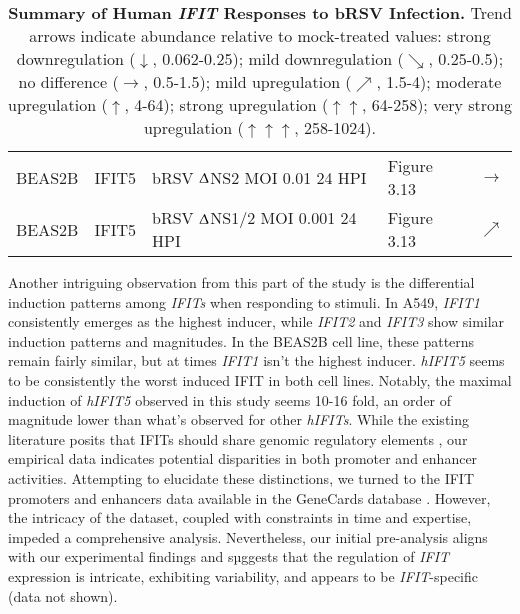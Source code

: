 \begin{table}
\begin{tabular}{lllll}
        BEAS2B & IFIT5 & bRSV $\Updelta$NS2 MOI 0.01 24 HPI & Figure 3.13 & \(\rightarrow\) \\ 
        BEAS2B & IFIT5 & bRSV $\Updelta$NS1/2 MOI 0.001 24 HPI & Figure 3.13 & \(\nearrow\) \\ \hline
    \end{tabular}
    \caption[Summary of Human \textit{IFIT} Responses to bRSV Infection.]{\textbf{Summary of Human \textit{IFIT} Responses to bRSV Infection.} Trend arrows indicate abundance relative to mock-treated values: strong downregulation ($\downarrow$, 0.062-0.25); mild downregulation ($\searrow$, 0.25-0.5); no difference ($\rightarrow$, 0.5-1.5); mild upregulation ($\nearrow$, 1.5-4); moderate upregulation ($\uparrow$, 4-64); strong upregulation ($\uparrow\uparrow$, 64-258); very strong upregulation ($\uparrow\uparrow\uparrow$, 258-1024).}
    \label{tab:Summary of Human IFIT Responses to bRSV Infection.}
\end{table}

Another intriguing observation from this part of the study is the differential induction patterns among \textit{IFITs} when responding to stimuli. In A549, \textit{IFIT1} consistently emerges as the highest inducer, while \textit{IFIT2} and \textit{IFIT3} show similar induction patterns and magnitudes. In the BEAS2B cell line, these patterns remain fairly similar, but at times \textit{IFIT1} isn't the highest inducer. \textit{hIFIT5} seems to be consistently the worst induced IFIT in both cell lines. Notably, the maximal induction of \textit{hIFIT5} observed in this study seems 10-16 fold, an order of magnitude lower than what's observed for other \textit{hIFITs}. While the existing literature posits that IFITs should share genomic regulatory elements \cite{Lou2009IFR-9/STAT2STAT1}, our empirical data indicates potential disparities in both promoter and enhancer activities. Attempting to elucidate these distinctions, we turned to the IFIT promoters and enhancers data available in the GeneCards database \cite{Stelzer2016TheAnalyses, Fishilevich2017GeneHancer:GeneCards}. However, the intricacy of the dataset, coupled with constraints in time and expertise, impeded a comprehensive analysis. Nevertheless, our initial pre-analysis aligns with our experimental findings and sµggests that the regulation of \textit{IFIT} expression is intricate, exhibiting variability, and appears to be \textit{IFIT}-specific (data not shown).

